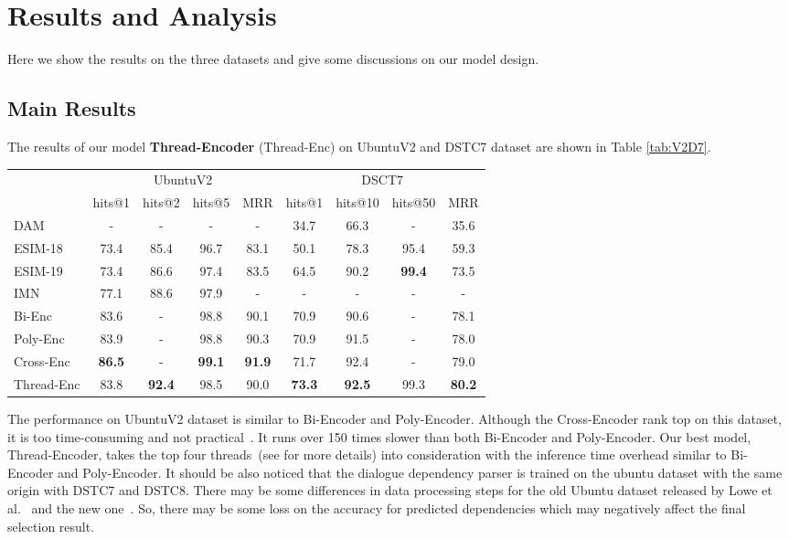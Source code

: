 \section{Results and Analysis}
\label{sec:ra}
Here we show the results on the three datasets and give some discussions on our model design.

\subsection{Main Results}
The results of our model \textbf{Thread-Encoder} (Thread-Enc) on UbuntuV2 and DSTC7 dataset are shown in Table \ref{tab:V2D7}. 
\begin{table*}[ht!]
	\centering
	\scriptsize
	\begin{tabular}{l|cccc|cccc}
		\toprule[1pt]
		\multirow{2}{*}{} &
		\multicolumn{4}{c|}{UbuntuV2} &
		\multicolumn{4}{c}{DSCT7}\\ 
		Model &  hits@1 & hits@2 & hits@5 & MRR& hits@1 & hits@10 & hits@50 & MRR\\
		\midrule[1pt]
		DAM & - & -& -& - &  34.7 & 66.3 & - & 35.6\\
		ESIM-18 &  73.4 & 85.4 & 96.7 & 83.1 & 50.1 & 78.3 & 95.4 & 59.3 \\
		ESIM-19& 73.4 & 86.6& 97.4& 83.5 & 64.5 & 90.2 & \bf 99.4 & 73.5 \\
		IMN &  77.1 & 88.6 & 97.9 &- & -& -& -&- \\
		Bi-Enc & 83.6 & - &  98.8 & 90.1  &70.9 & 90.6 &  - & 78.1\\
		Poly-Enc & 83.9 & - & 98.8 & 90.3 &70.9 & 91.5 & - & 78.0\\
		Cross-Enc & \bf 86.5 & - & \bf 99.1 & \bf 91.9&71.7 & 92.4 & - & 79.0 \\
		\hline
		Thread-Enc	& 83.8 & \bf 92.4 & 98.5 & 90.0 & \bf 73.3 & \bf 92.5 & 99.3 & \bf 80.2 \\
		\bottomrule[1pt]
	\end{tabular}
	\caption{Results on UbuntuV2 and DSTC7 dataset.}
	\label{tab:V2D7}
\end{table*}
The performance on UbuntuV2 dataset is similar to Bi-Encoder and Poly-Encoder.
Although the Cross-Encoder rank top on this dataset, it is too time-consuming and 
not practical~\cite{humeau2019poly}. It runs over 150 times slower than both Bi-Encoder 
and Poly-Encoder. Our best model, Thread-Encoder, takes the top four threads~(see  for more details) 
into consideration with the inference time overhead similar to Bi-Encoder and Poly-Encoder. 
It should be also noticed that the dialogue dependency parser is trained on the ubuntu dataset with the same origin with DSTC7 and DSTC8. There may be some differences in data processing steps for the old Ubuntu dataset released by Lowe et al.~\cite{LowePSCLP17} and the new one~\cite{KummerfeldGPAGG19}. So, there may be some loss on the accuracy for predicted dependencies which may negatively
affect the final selection result. 

